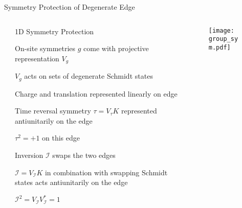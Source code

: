 \begin{frame}{Symmetry Protection of Degenerate Edge}
\vskip-1.5cm
\begin{columns}[T]
    \begin{column}[T]{.8\textwidth}
    \end{column}
    \begin{block}{1D Symmetry Protection}
      \bi
      \item[] On-site symmetries $g$ come with projective representation $V_g$
      \item $V_g$ acts on sets of degenerate Schmidt states
      \item Charge and translation represented linearly on edge
      \item[] Time reversal symmetry $\tau = V_{\tau} K$ represented antiunitarily on the edge
      \item $\tau^2 = +1$ on this edge
      \item[] Inversion $\mathcal{I}$ swaps the two edges
      \item  $\mathcal{I} = V_{\mathcal{I}} K$ in combination with swapping Schmidt states acts antiunitarily on the edge
      \item $\mathcal{I}^2 = V_{\mathcal{I}} V_{\mathcal{I}}^{*} = 1$
      \ei
    \end{block}
    \begin{column}[T]{.2\textwidth}
    	\begin{figure}
    		\texttt{[image: group\_sym.pdf]}
    	\end{figure}
    \end{column}
\end{columns}
\end{frame}